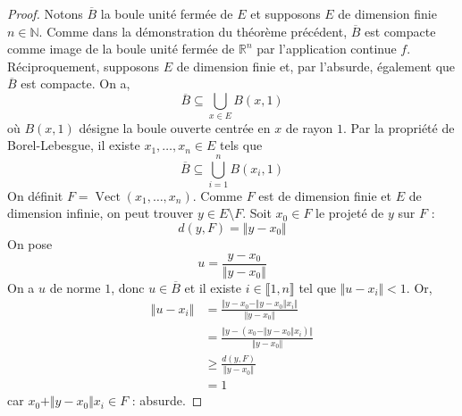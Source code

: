   \begin{proof}
    Notons $\overline{B}$ la boule unité fermée de $E$ et supposons $E$ de dimension finie $n \in \mathbb{N}$. Comme dans la démonstration du théorème précédent, $\overline{B}$ est compacte comme image de la boule unité fermée de $\mathbb{R}^n$ par l'application continue $f$. Réciproquement, supposons $E$ de dimension finie et, par l'absurde, également que $\overline{B}$ est compacte. On a,
    \[ \overline{B} \subseteq \bigcup_{x \in E} B(x,1) \]
    où $B(x,1)$ désigne la boule ouverte centrée en $x$ de rayon $1$. Par la propriété de Borel-Lebesgue, il existe $x_1, \dots, x_n \in E$ tels que
    \[ \overline{B} \subseteq \bigcup_{i=1}^n B(x_i,1) \]
    On définit $F = \operatorname{Vect}(x_1, \dots, x_n)$. Comme $F$ est de dimension finie et $E$ de dimension infinie, on peut trouver $y \in E \setminus F$. Soit $x_0 \in F$ le projeté de $y$ sur $F$ :
    \[ d(y, F) = \Vert y - x_0 \Vert \]
    On pose
    \[ u = \frac{y - x_0}{\Vert y - x_0 \Vert} \]
    On a $u$ de norme $1$, donc $u \in \overline{B}$ et il existe $i \in \llbracket 1, n \rrbracket$ tel que $\Vert u - x_i \Vert < 1$. Or,
    \begin{align*}
      \Vert u - x_i \Vert &= \frac{\Vert y - x_0 - \Vert y - x_0 \Vert x_i \Vert}{\Vert y - x_0 \Vert} \\
      &= \frac{\Vert y - (x_0 - \Vert y - x_0 \Vert x_i) \Vert}{\Vert y - x_0 \Vert} \\
      &\geq \frac{d(y, F)}{\Vert y - x_0 \Vert} \\
      &= 1
    \end{align*}
    car $x_0 + \Vert y - x_0 \Vert x_i \in F$ : absurde.
  \end{proof}

